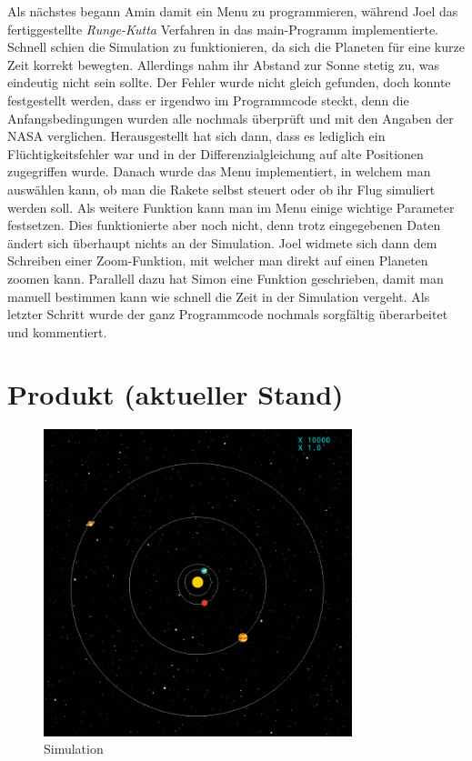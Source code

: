\documentclass{article}
\begin{document}
Als nächstes begann Amin damit ein Menu zu programmieren, während Joel das fertiggestellte \textit{Runge-Kutta} Verfahren in das main-Programm implementierte. Schnell schien die Simulation zu funktionieren, da sich die Planeten für eine kurze Zeit korrekt bewegten. Allerdings nahm ihr Abstand zur Sonne stetig zu, was eindeutig nicht sein sollte. Der Fehler wurde nicht gleich gefunden, doch konnte festgestellt werden, dass er irgendwo im Programmcode steckt, denn die Anfangsbedingungen wurden alle nochmals überprüft und mit den Angaben der NASA verglichen. Herausgestellt hat sich dann, dass es lediglich ein Flüchtigkeitsfehler war und in der Differenzialgleichung auf alte Positionen zugegriffen wurde.
Danach wurde das Menu implementiert, in welchem man auswählen kann, ob man die Rakete selbst steuert oder ob ihr Flug simuliert werden soll. Als weitere Funktion kann man im Menu einige wichtige Parameter festsetzen. Dies funktionierte aber noch nicht, denn trotz eingegebenen Daten ändert sich überhaupt nichts an der Simulation. Joel widmete sich dann dem Schreiben einer Zoom-Funktion, mit welcher man direkt auf einen Planeten zoomen kann. Parallell dazu hat Simon eine Funktion geschrieben, damit man manuell bestimmen kann wie schnell die Zeit in der Simulation vergeht. 
Als letzter Schritt wurde der ganz Programmcode nochmals sorgfältig überarbeitet und kommentiert.

\section{Produkt (aktueller Stand)}
\begin{figure}[hbt]
	\centering
		\includegraphics[width=0.8\textwidth]{game.png}
	\caption{Simulation}
	\label{img:simulation}
\end{figure}
\end{document}
